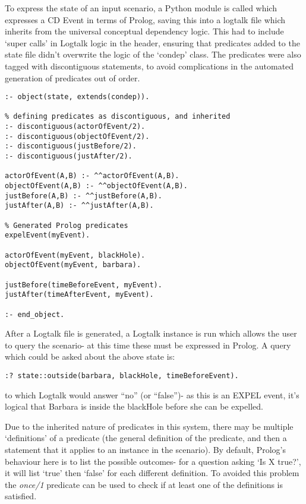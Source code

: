 \documentclass[report]{subfiles}
\begin{document}
    To express the state of an input scenario, a Python module is called which expresses a CD Event in terms of Prolog, saving this into a logtalk file which inherits from the universal conceptual dependency logic. This had to include `super calls' in Logtalk logic in the header, ensuring that predicates added to the state file didn't overwrite the logic of the `condep' class. The predicates were also tagged with discontiguous statements, to avoid complications in the automated generation of predicates out of order. 

\begin{lstlisting}[caption={An example `state', inhereiting from the `condep' Logtalk object},]
:- object(state, extends(condep)).

% defining predicates as discontiguous, and inherited
:- discontiguous(actorOfEvent/2).
:- discontiguous(objectOfEvent/2).
:- discontiguous(justBefore/2).
:- discontiguous(justAfter/2).

actorOfEvent(A,B) :- ^^actorOfEvent(A,B).
objectOfEvent(A,B) :- ^^objectOfEvent(A,B).
justBefore(A,B) :- ^^justBefore(A,B).
justAfter(A,B) :- ^^justAfter(A,B).

% Generated Prolog predicates
expelEvent(myEvent).

actorOfEvent(myEvent, blackHole).
objectOfEvent(myEvent, barbara).

justBefore(timeBeforeEvent, myEvent).
justAfter(timeAfterEvent, myEvent).		

:- end_object.
\end{lstlisting}

After a Logtalk file is generated, a Logtalk instance is run which allows the user to query the scenario- at this time these must be expressed in Prolog. A query which could be asked about the above state is:
\begin{lstlisting}
:? state::outside(barbara, blackHole, timeBeforeEvent).
\end{lstlisting}
to which Logtalk would answer ``no'' (or ``false'')- as this is an EXPEL event, it's logical that Barbara is inside the blackHole before she can be expelled.


Due to the inherited nature of predicates in this system, there may be multiple `definitions' of a predicate (the general definition of the predicate, and then a statement that it applies to an instance in the scenario). By default, Prolog's behaviour here is to list the possible outcomes- for a question asking `Is X true?', it will list `true' then `false' for each different definition. To avoided this problem the \textit{once/1} predicate can be used to check if at least one of the definitions is satisfied.
\end{document}
